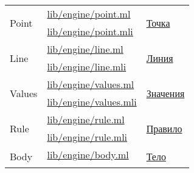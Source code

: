 \begin{centering}
\begin{longtable}{|l|l|l|}
        \multirow{2}{*}{Point}                                & \href{https://github.com/prekel/chapgame/blob/master/lib/engine/point.ml}{lib/engine/point.ml}                                 & \multirow{2}{*}{\hyperref[pointlinedescr]{Точка}}                               \\*
                                                              & \href{https://github.com/prekel/chapgame/blob/master/lib/engine/point.mli}{lib/engine/point.mli}                               &                                                                                 \\ \hline
        \multirow{2}{*}{Line}                                 & \href{https://github.com/prekel/chapgame/blob/master/lib/engine/line.ml}{lib/engine/line.ml}                                   & \multirow{2}{*}{\hyperref[pointlinedescr]{Линия}}                               \\*
                                                              & \href{https://github.com/prekel/chapgame/blob/master/lib/engine/line.mli}{lib/engine/line.mli}                                 &                                                                                 \\ \hline
        \multirow{2}{*}{Values}                               & \href{https://github.com/prekel/chapgame/blob/master/lib/engine/values.ml}{lib/engine/values.ml}                               & \multirow{2}{*}{\hyperref[valuesdescr]{Значения}}                               \\*
                                                              & \href{https://github.com/prekel/chapgame/blob/master/lib/engine/values.mli}{lib/engine/values.mli}                             &                                                                                 \\ \hline
        \multirow{2}{*}{Rule}                                 & \href{https://github.com/prekel/chapgame/blob/master/lib/engine/rule.ml}{lib/engine/rule.ml}                                   & \multirow{2}{*}{\hyperref[rulesdescr]{Правило}}                                 \\*
                                                              & \href{https://github.com/prekel/chapgame/blob/master/lib/engine/rule.mli}{lib/engine/rule.mli}                                 &                                                                                 \\ \hline
        \multirow{2}{*}{Body}                                 & \href{https://github.com/prekel/chapgame/blob/master/lib/engine/body.ml}{lib/engine/body.ml}                                   & \multirow{2}{*}{\hyperref[bodydescr]{Тело}}                                     \\*

\end{longtable}
\end{centering}
